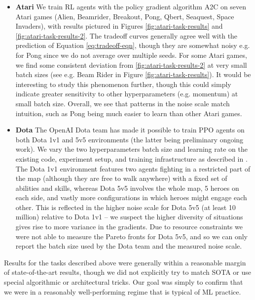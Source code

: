\documentclass[english]{article}
\begin{document}
\begin{itemize}
\item {\bf Atari}  We train RL agents with the policy gradient algorithm A2C \cite{DBLP:journals/corr/MnihBMGLHSK16} on seven Atari games \cite{DBLP:journals/corr/abs-1207-4708} (Alien, Beamrider,  Breakout, Pong, Qbert, Seaquest, Space Invaders), with results  pictured in Figures \ref{fig:atari-task-results} and \ref{fig:atari-task-results-2}.  The tradeoff curves generally agree well with the prediction of Equation \ref{eq:tradeoff-eqn}, though they are somewhat noisy e.g. for Pong since we do not average over multiple seeds.  For some Atari games, we find some consistent deviation from \ref{fig:atari-task-results-2} at very small batch sizes (see e.g. Beam Rider in Figure \ref{fig:atari-task-results}).  It would be interesting to study this phenomenon further, though this could simply indicate greater sensitivity to other hyperparameters (e.g. momentum) at small batch size.  Overall, we see that patterns in the noise scale match intuition, such as Pong being much easier to learn than other Atari games.
\item {\bf Dota} The OpenAI Dota team has made it possible to train PPO \cite{DBLP:journals/corr/SchulmanWDRK17} agents on both Dota 1v1 and 5v5 environments (the latter being preliminary ongoing work). We vary the two hyperparameters batch size and learning rate on the existing code, experiment setup, and training infrastructure as described in \cite{OpenAI_Five}. The Dota 1v1 environment features two agents fighting in a restricted part of the map (although they are free to walk anywhere) with a fixed set of abilities and skills, whereas Dota 5v5 involves the whole map, 5 heroes on each side, and vastly more configurations in which heroes might engage each other.  This is reflected in the higher noise scale for Dota 5v5 (at least 10 million) relative to Dota 1v1 -- we suspect the higher diversity of situations gives rise to more variance in the gradients.  Due to resource constraints we were not able to measure the Pareto fronts for Dota 5v5, and so we can only report the batch size used by the Dota team and the measured noise scale.
\end{itemize}

Results for the tasks described above were generally within a reasonable margin of state-of-the-art results, though we did not explicitly try to match SOTA or use special algorithmic or architectural tricks.  Our goal was simply to confirm that we were in a reasonably well-performing regime that is typical of ML practice.
\end{document}

